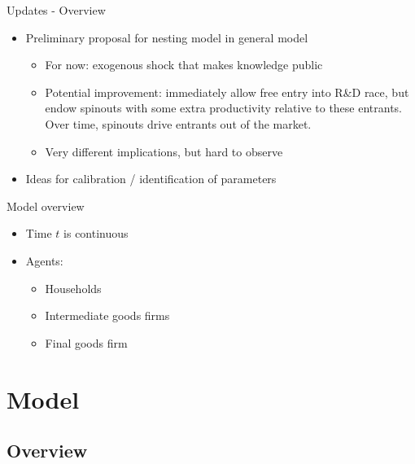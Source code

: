 \documentclass[english,usenames,dvipsnames]{beamer}
\begin{document}
\begin{frame}{Updates - Overview}
	\begin{itemize}
		\item Preliminary proposal for nesting model in general model 
		\begin{itemize}
			\item For now: exogenous shock that makes knowledge public
			\item Potential improvement: immediately allow free entry into R\&D race, but endow spinouts with some extra productivity relative to these entrants. Over time, spinouts drive entrants out of the market.
			\item Very different implications, but hard to observe
		\end{itemize}
		\item Ideas for calibration / identification of parameters
	\end{itemize}
\end{frame}

\begin{frame}{Model overview}
\begin{itemize}
	\item Time $t$ is continuous 
	\item Agents:
	\begin{itemize}
		\item Households 
		\item Intermediate goods firms
		\item Final goods firm 
	\end{itemize}
\end{itemize}
\end{frame}


\section{Model}
\subsection{Overview}

\end{document}
